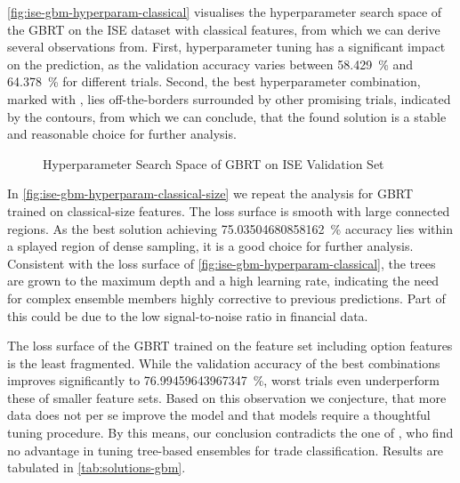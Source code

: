 \cref{fig:ise-gbm-hyperparam-classical} visualises the hyperparameter search space of the \gls{GBRT} on the \gls{ISE} dataset with classical features, from which we can derive several observations from. First, hyperparameter tuning has a significant impact on the prediction, as the validation accuracy varies between \SI{58.429}{\percent} and \SI{64.378}{\percent} for different trials. Second, the best hyperparameter combination, marked with \bestcircle, lies off-the-borders surrounded by other promising trials, indicated by the contours, from which we can conclude, that the found solution is a stable and reasonable choice for further analysis.

\begin{figure}[!b]
    \vfill
\end{figure}
\clearpage
\begin{figure}[ht]
    \addtocounter{figure}{-1}
    \caption[]{Hyperparameter Search Space of \gls{GBRT} on \gls{ISE} Validation Set}
    \label{fig:ise-gbm-hyperparam}
\end{figure}

In \cref{fig:ise-gbm-hyperparam-classical-size} we repeat the analysis for \gls{GBRT} trained on classical-size features. The loss surface is smooth with large connected regions. As the best solution achieving \SI{75.03504680858162}{\percent} accuracy lies within a splayed region of dense sampling, it is a good choice for further analysis. Consistent with the loss surface of \cref{fig:ise-gbm-hyperparam-classical}, the trees are grown to the maximum depth and a high learning rate, indicating the need for complex ensemble members highly corrective to previous predictions. Part of this could be due to the low signal-to-noise ratio in financial data.

The loss surface of the \gls{GBRT} trained on the feature set including option features is the least fragmented. While the validation accuracy of the best combinations improves significantly to \SI{76.99459643967347}{\percent}, worst trials even underperform these of smaller feature sets. Based on this observation we conjecture, that more data does not per se improve the model and that models require a thoughtful tuning procedure. By this means, our conclusion contradicts the one of \textcite[][14]{ronenMachineLearningTrade2022}, who find no advantage in tuning tree-based ensembles for trade classification. Results are tabulated in \cref{tab:solutions-gbm}.

